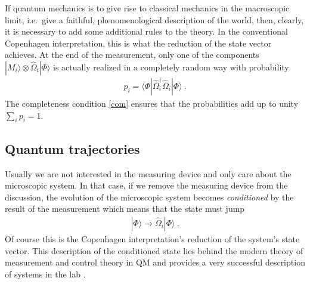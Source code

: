 \documentclass[12pt]{article}
\theoremstyle{plain}
\theoremstyle{definition}
\theoremstyle{remark}
\def\bra#1{\langle #1|}
\def\ket#1{| #1\rangle}
\newcommand{\EQ}[1]{\begin{equation}\begin{split} #1
\end{split}\end{equation}}
\begin{document}
If quantum mechanics is to give rise to classical mechanics in the macroscopic limit, i.e.~give a faithful, phenomenological description of the world, then, clearly, it is necessary to add some additional rules to the theory. In the conventional Copenhagen interpretation, this is what the reduction of the state vector achieves. 
At the end of the measurement, only one of the components $\ket{M_i}\otimes\hat\Omega_i\ket{\Phi}$ is actually realized in a completely random way with probability
\EQ{
p_i=\bra{\Phi}\hat\Omega_i^\dagger\hat\Omega_i\ket{\Phi}\ .
\label{ppr}
}
The completeness condition \eqref{com} ensures that the probabilities add up to unity $\sum_ip_i=1$. 

\subsection{Quantum trajectories}\label{s2.2}

Usually we are not interested in the measuring device and only care about the microscopic system. In that case, if we remove the measuring device from the discussion, the evolution of the microscopic system becomes {\it conditioned\/} by the result of the measurement which means that the state must jump
\EQ{
\ket{\Phi}\longrightarrow\hat\Omega_i\ket{\Phi}\ .
\label{col}
} 
Of course this is the Copenhagen interpretation's reduction of the system's state vector.
This description of the conditioned state lies behind the modern theory of measurement and control theory in QM and provides a very successful description of systems in the lab \cite{WMbook,PK}. 
\end{document}

